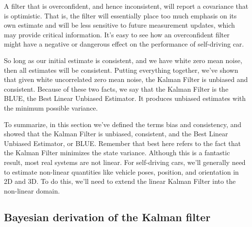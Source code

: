 A filter that is overconfident,
and hence inconsistent, will report a covariance
that is optimistic. That is, the filter will essentially place
too much emphasis on its own estimate and will be less sensitive to
future measurement updates, which may provide critical information. It's easy to see how an overconfident
filter might have a negative or dangerous effect on the performance
of self-driving car. 

So long as our initial
estimate is consistent, and we have white zero mean noise,
then all estimates will be consistent. Putting everything together,
we've shown that given white uncorrelated zero mean noise, the Kalman
Filter is unbiased and consistent. Because of these two facts, we say that the Kalman Filter is the BLUE,
the Best Linear Unbiased Estimator. It produces unbiased estimates with
the minimum possible variance. 

To summarize, in this section we've defined the terms bias and consistency, and
showed that the Kalman Filter is unbiased, consistent, and the Best Linear
Unbiased Estimator, or BLUE. Remember that best here refers to
the fact that the Kalman Filter minimizes the state variance. Although this is a fantastic result,
most real systems are not linear. For self-driving cars, we'll
generally need to estimate non-linear quantities like vehicle poses,
position, and orientation in 2D and 3D. To do this, we'll need to extend the linear
Kalman Filter into the non-linear domain. 


\subsection{Bayesian derivation of the Kalman filter}


